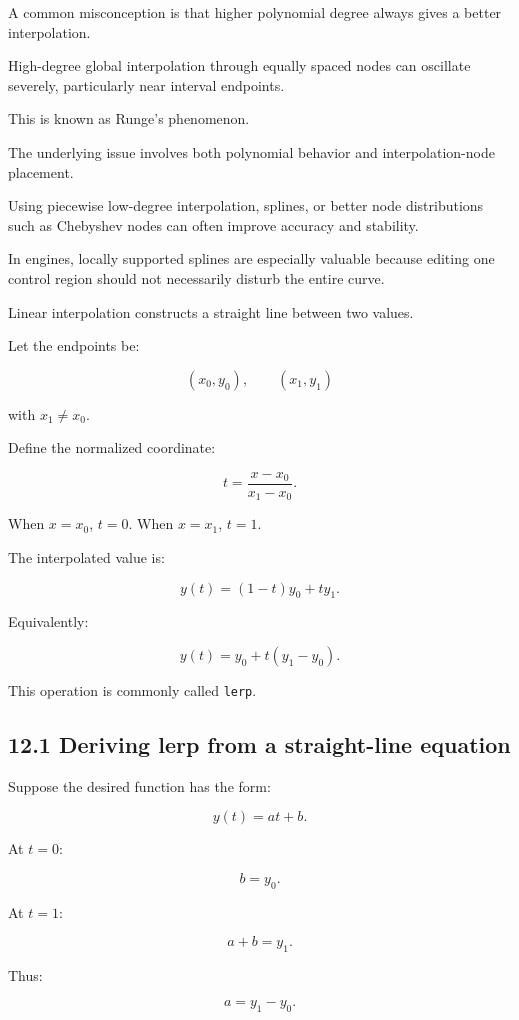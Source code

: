 A common misconception is that higher polynomial degree always gives a better interpolation.

High-degree global interpolation through equally spaced nodes can oscillate severely, particularly near interval endpoints.

This is known as Runge's phenomenon.

The underlying issue involves both polynomial behavior and interpolation-node placement.

Using piecewise low-degree interpolation, splines, or better node distributions such as Chebyshev nodes can often improve accuracy and stability.

In engines, locally supported splines are especially valuable because editing one control region should not necessarily disturb the entire curve.

Linear interpolation constructs a straight line between two values.

Let the endpoints be:

\[ (x_0,y_0),\qquad(x_1,y_1) \]

with \(x_1\ne x_0\).

Define the normalized coordinate:

\[ \boxed{ t=\frac{x-x_0}{x_1-x_0} }. \]

When \(x=x_0\), \(t=0\). When \(x=x_1\), \(t=1\).

The interpolated value is:

\[ \boxed{ y(t)=(1-t)y_0+ty_1 }. \]

Equivalently:

\[ \boxed{ y(t)=y_0+t(y_1-y_0) }. \]

This operation is commonly called \texttt{lerp}.

\subsection{12.1 Deriving lerp from a straight-line equation}\label{02-foundations-ii-ch028-deriving-lerp-from-a-straight-line-equation}

Suppose the desired function has the form:

\[ y(t)=at+b. \]

At \(t=0\):

\[ b=y_0. \]

At \(t=1\):

\[ a+b=y_1. \]

Thus:

\[ a=y_1-y_0. \]

